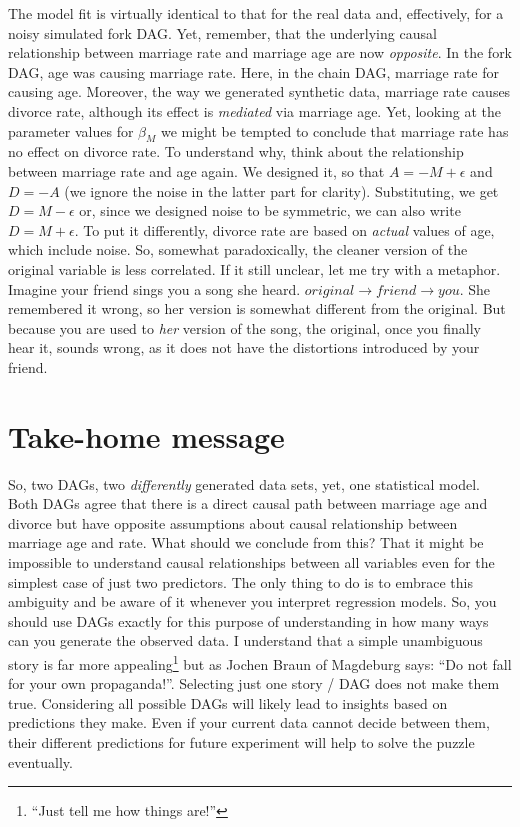 \documentclass[
]{book}
\begin{document}
The model fit is virtually identical to that for the real data and, effectively, for a noisy simulated fork DAG. Yet, remember, that the underlying causal relationship between marriage rate and marriage age are now \emph{opposite}. In the fork DAG, age was causing marriage rate. Here, in the chain DAG, marriage rate for causing age. Moreover, the way we generated synthetic data, marriage rate causes divorce rate, although its effect is \emph{mediated} via marriage age. Yet, looking at the parameter values for \(\beta_M\) we might be tempted to conclude that marriage rate has no effect on divorce rate. To understand why, think about the relationship between marriage rate and age again. We designed it, so that \(A = -M + \epsilon\) and \(D = -A\) (we ignore the noise in the latter part for clarity). Substituting, we get \(D = M - \epsilon\) or, since we designed noise to be symmetric, we can also write \(D = M + \epsilon\). To put it differently, divorce rate are based on \emph{actual} values of age, which include noise. So, somewhat paradoxically, the cleaner version of the original variable is less correlated. If it still unclear, let me try with a metaphor. Imagine your friend sings you a song she heard. \(original \rightarrow friend \rightarrow you\). She remembered it wrong, so her version is somewhat different from the original. But because you are used to \emph{her} version of the song, the original, once you finally hear it, sounds wrong, as it does not have the distortions introduced by your friend.

\hypertarget{take-home-message}{%
\section{Take-home message}\label{take-home-message}}

So, two DAGs, two \emph{differently} generated data sets, yet, one statistical model. Both DAGs agree that there is a direct causal path between marriage age and divorce but have opposite assumptions about causal relationship between marriage age and rate. What should we conclude from this? That it might be impossible to understand causal relationships between all variables even for the simplest case of just two predictors. The only thing to do is to embrace this ambiguity and be aware of it whenever you interpret regression models. So, you should use DAGs exactly for this purpose of understanding in how many ways can you generate the observed data. I understand that a simple unambiguous story is far more appealing\footnote{``Just tell me how things are!''} but as Jochen Braun of Magdeburg says: ``Do not fall for your own propaganda!''. Selecting just one story / DAG does not make them true. Considering all possible DAGs will likely lead to insights based on predictions they make. Even if your current data cannot decide between them, their different predictions for future experiment will help to solve the puzzle eventually.
\end{document}
